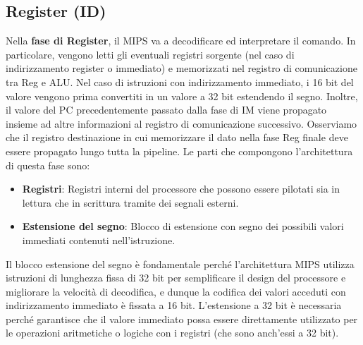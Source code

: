 \subsection{Register (ID)}
Nella \textbf{fase di Register}, il MIPS va a decodificare ed interpretare il comando. In particolare, vengono letti gli eventuali registri sorgente (nel caso di indirizzamento register o immediato) e memorizzati nel registro di comunicazione tra Reg e ALU. Nel caso di istruzioni con indirizzamento immediato, i 16 bit del valore vengono prima convertiti in un valore a 32 bit estendendo il segno. Inoltre, il valore del PC precedentemente passato dalla fase di IM viene propagato insieme ad altre informazioni al registro di comunicazione successivo. Osserviamo che il registro destinazione in cui memorizzare il dato nella fase Reg finale deve essere propagato lungo tutta la pipeline.
Le parti che compongono l'architettura di questa fase sono:
\begin{itemize}
    \item \textbf{Registri}: Registri interni del processore che possono essere pilotati sia in lettura che in scrittura tramite dei segnali esterni.
    \item \textbf{Estensione del segno}: Blocco di estensione con segno dei possibili valori immediati contenuti nell'istruzione.
\end{itemize}
Il blocco estensione del segno è fondamentale perché l'architettura MIPS utilizza istruzioni di lunghezza fissa di 32 bit per semplificare il design del processore e migliorare la velocità di decodifica, e dunque la codifica dei valori acceduti con indirizzamento immediato è fissata a 16 bit. L'estensione a 32 bit è necessaria perché garantisce che il valore immediato possa essere direttamente utilizzato per le operazioni aritmetiche o logiche con i registri (che sono anch'essi a 32 bit).

